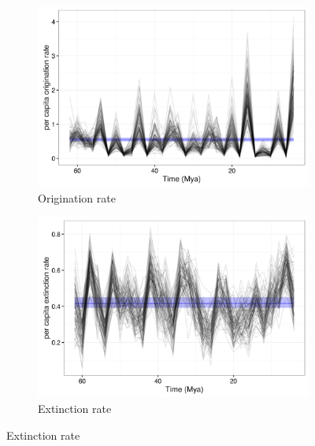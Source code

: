 \documentclass[12pt,letterpaper]{article}
\begin{document}
\begin{figure}[ht]
  \begin{subfigure}[b]{0.45\textwidth}
    \includegraphics[width=\textwidth,height=0.4\textheight,keepaspectratio=true]{figure/orig_rate}
    \caption{Origination rate}
    \label{fig:origin_rate}
  \end{subfigure}
  \begin{subfigure}[b]{0.45\textwidth}
    \includegraphics[width=\textwidth,height=0.4\textheight,keepaspectratio=true]{figure/death_rate}
    \caption{Extinction rate}
    \label{fig:extinct_rate}
  \end{subfigure}

\end{figure}
\end{document}
